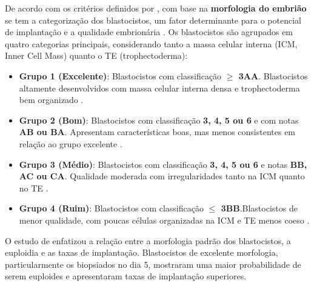 De acordo com os critérios definidos por , com base na \textbf{morfologia do embrião} se tem a categorização dos blastocistos, um fator determinante para o potencial de implantação e a qualidade embrionária \cite{capalbo2014}. Os blastocistos são agrupados em quatro categorias principais, considerando tanto a massa celular interna (ICM, Inner Cell Mass) quanto o TE (trophectoderma):
\begin{itemize}
  \item \textbf{Grupo 1 (Excelente)}: Blastocistos com classificação  \textbf{$\geq$ 3AA}. Blastocistos altamente desenvolvidos com massa celular interna densa e trophectoderma bem organizado \cite{capalbo2014}.
  \item \textbf{Grupo 2 (Bom)}: Blastocistos com classificação \textbf{3, 4, 5 ou 6} e com notas \textbf{AB ou BA}. Apresentam características boas, mas menos consistentes em relação ao grupo excelente \cite{capalbo2014}.
  \item \textbf{Grupo 3 (Médio)}: Blastocistos com classificação \textbf{3, 4, 5 ou 6} e notas \textbf{BB, AC ou CA}. Qualidade moderada com irregularidades tanto na ICM quanto no TE \cite{capalbo2014}.
  \item \textbf{Grupo 4 (Ruim)}: Blastocistos com classificação \textbf{$\leq$ 3BB}.Blastocistos de menor qualidade, com poucas células organizadas na ICM e TE menos coeso \cite{capalbo2014}.
\end{itemize}
O estudo de  enfatizou a relação entre a morfologia padrão dos blastocistos, a euploidia e as taxas de implantação. Blastocistos de excelente morfologia, particularmente os biopsiados no dia 5, mostraram uma maior probabilidade de serem euploides e apresentaram taxas de implantação superiores.

